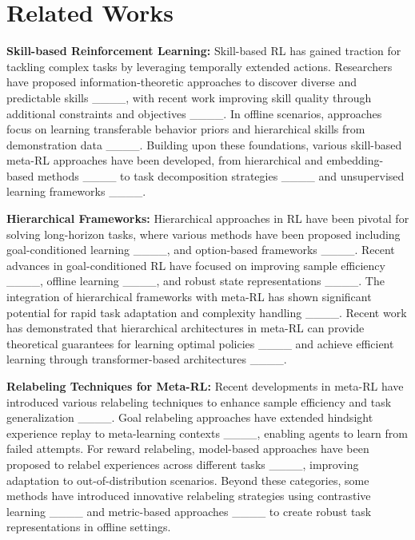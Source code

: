 \section{Related Works}
\label{sec:related}
\textbf{Skill-based Reinforcement Learning: }Skill-based RL has gained traction for tackling complex tasks by leveraging temporally extended actions. Researchers have proposed information-theoretic approaches to discover diverse and predictable skills ____, with recent work improving skill quality through additional constraints and objectives ____. In offline scenarios, approaches focus on learning transferable behavior priors and hierarchical skills from demonstration data ____. Building upon these foundations, various skill-based meta-RL approaches have been developed, from hierarchical and embedding-based methods ____ to task decomposition strategies ____ and unsupervised learning frameworks ____.


\textbf{Hierarchical Frameworks: }Hierarchical approaches in RL have been pivotal for solving long-horizon tasks, where various methods have been proposed including goal-conditioned learning ____, and option-based frameworks ____. Recent advances in goal-conditioned RL have focused on improving sample efficiency ____, offline learning ____, and robust state representations ____. The integration of hierarchical frameworks with meta-RL has shown significant potential for rapid task adaptation and complexity handling ____. Recent work has demonstrated that hierarchical architectures in meta-RL can provide theoretical guarantees for learning optimal policies ____ and achieve efficient learning through transformer-based architectures ____.


\textbf{Relabeling Techniques for Meta-RL: }Recent developments in meta-RL have introduced various relabeling techniques to enhance sample efficiency and task generalization ____. Goal relabeling approaches have extended hindsight experience replay to meta-learning contexts ____, enabling agents to learn from failed attempts. For reward relabeling, model-based approaches have been proposed to relabel experiences across different tasks ____, improving adaptation to out-of-distribution scenarios. Beyond these categories, some methods have introduced innovative relabeling strategies using contrastive learning ____ and metric-based approaches ____ to create robust task representations in offline settings.